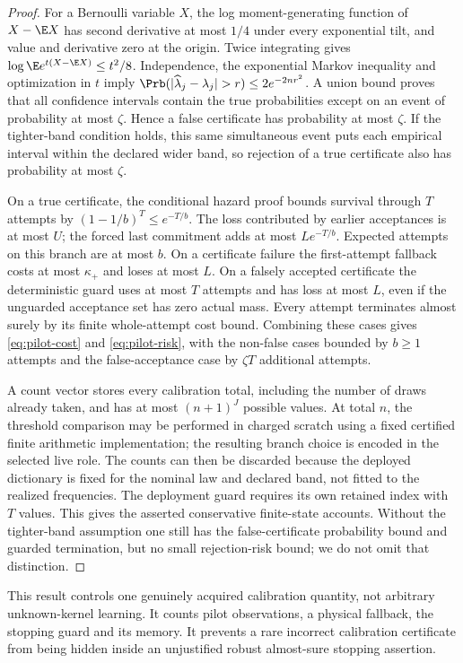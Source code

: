 \begin{proof}
For a Bernoulli variable $X$, the log moment-generating function of $X-\E X$ has second derivative at most $1/4$ under every exponential tilt, and value and derivative zero at the origin. Twice integrating gives $\log\E e^{t(X-\E X)}\le t^2/8$. Independence, the exponential Markov inequality and optimization in $t$ imply $\Prb(|\widehat\lambda_j-\lambda_j|>r)\le2e^{-2nr^2}$. A union bound proves that all confidence intervals contain the true probabilities except on an event of probability at most $\zeta$. Hence a false certificate has probability at most $\zeta$. If the tighter-band condition holds, this same simultaneous event puts each empirical interval within the declared wider band, so rejection of a true certificate also has probability at most $\zeta$.

On a true certificate, the conditional hazard proof bounds survival through $T$ attempts by $(1-1/b)^T\le e^{-T/b}$. The loss contributed by earlier acceptances is at most $U$; the forced last commitment adds at most $Le^{-T/b}$. Expected attempts on this branch are at most $b$. On a certificate failure the first-attempt fallback costs at most $\kappa_+$ and loses at most $L$. On a falsely accepted certificate the deterministic guard uses at most $T$ attempts and has loss at most $L$, even if the unguarded acceptance set has zero actual mass. Every attempt terminates almost surely by its finite whole-attempt cost bound. Combining these cases gives \eqref{eq:pilot-cost} and \eqref{eq:pilot-risk}, with the non-false cases bounded by $b\ge1$ attempts and the false-acceptance case by $\zeta T$ additional attempts.

A count vector stores every calibration total, including the number of draws already taken, and has at most $(n+1)^J$ possible values. At total $n$, the threshold comparison may be performed in charged scratch using a fixed certified finite arithmetic implementation; the resulting branch choice is encoded in the selected live role. The counts can then be discarded because the deployed dictionary is fixed for the nominal law and declared band, not fitted to the realized frequencies. The deployment guard requires its own retained index with $T$ values. This gives the asserted conservative finite-state accounts. Without the tighter-band assumption one still has the false-certificate probability bound and guarded termination, but no small rejection-risk bound; we do not omit that distinction.
\end{proof}

This result controls one genuinely acquired calibration quantity, not arbitrary unknown-kernel learning. It counts pilot observations, a physical fallback, the stopping guard and its memory. It prevents a rare incorrect calibration certificate from being hidden inside an unjustified robust almost-sure stopping assertion.
